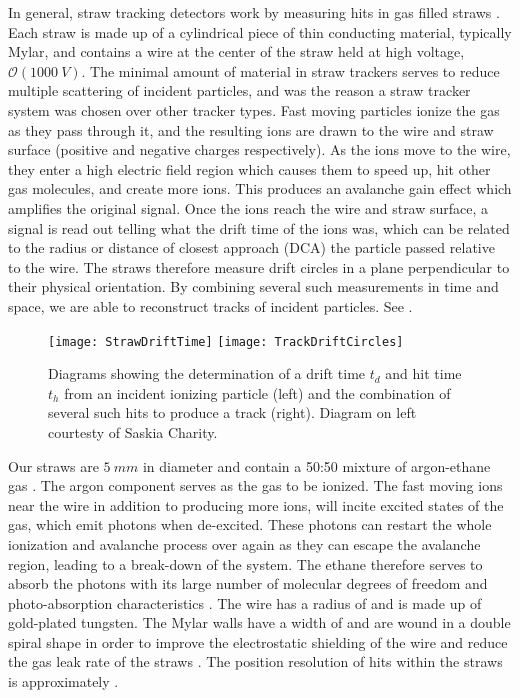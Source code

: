 In general, straw tracking detectors work by measuring hits in gas filled straws \cite{Blum}. Each straw is made up of a cylindrical piece of thin conducting material, typically Mylar, and contains a wire at the center of the straw held at high voltage, $\mathcal{O}(\SI{1000}{V})$. The minimal amount of material in straw trackers serves to reduce multiple scattering of incident particles, and was the reason a straw tracker system was chosen over other tracker types. Fast moving particles ionize the gas as they pass through it, and the resulting ions are drawn to the wire and straw surface (positive and negative charges respectively). As the ions move to the wire, they enter a high electric field region which causes them to speed up, hit other gas molecules, and create more ions. This produces an avalanche gain effect which amplifies the original signal. Once the ions reach the wire and straw surface, a signal is read out telling what the drift time of the ions was, which can be related to the radius or distance of closest approach (DCA) the particle passed relative to the wire. The straws therefore measure drift circles in a plane perpendicular to their physical orientation. By combining several such measurements in time and space, we are able to reconstruct tracks of incident particles. See .

\begin{figure}[]
\centering
        \texttt{[image: StrawDriftTime]}
    \hspace{1cm}
        \texttt{[image: TrackDriftCircles]}
\caption[Straw tracker drift circles]{Diagrams showing the determination of a drift time $t_{d}$ and hit time $t_{h}$ from an incident ionizing particle (left) and the combination of several such hits to produce a track (right). Diagram on left courtesty of Saskia Charity.}
\label{fig:driftcircles}
\end{figure}




Our straws are $\SI{5}{mm}$ in diameter and contain a 50:50 mixture of argon-ethane gas \cite{WTThesis}. The argon component serves as the gas to be ionized. The fast moving ions near the wire in addition to producing more ions, will incite excited states of the gas, which emit photons when de-excited. These photons can restart the whole ionization and avalanche process over again as they can escape the avalanche region, leading to a break-down of the system. The ethane therefore serves to absorb the photons with its large number of molecular degrees of freedom and photo-absorption characteristics \cite{WTThesis}. The wire has a radius of  and is made up of gold-plated tungsten. The Mylar walls have a width of  and are wound in a double spiral shape in order to improve the electrostatic shielding of the wire and reduce the gas leak rate of the straws \cite{WTThesis}. The position resolution of hits within the straws is approximately  \cite{something}.


